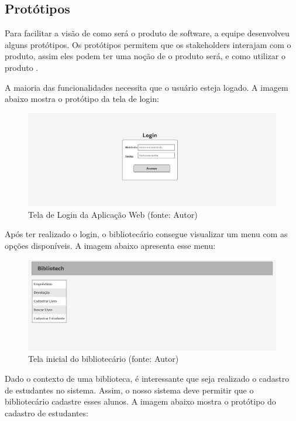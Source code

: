 \subsection[Protótipos]{Protótipos}
Para facilitar a visão de como será o produto de software, a equipe desenvolveu alguns protótipos. Os protótipos permitem que os stakeholders interajam com o produto, assim eles podem ter uma noção de o produto será, e como utilizar o produto \cite{preece2005}. 

A maioria das funcionalidades necessita que o usuário esteja logado. A imagem abaixo mostra o protótipo da tela de login: 

\begin{figure}[!h]
\centering
\includegraphics[scale=0.40, angle = 360]{figuras/prototipo1}
\caption[]{Tela de Login da Aplicação Web (fonte: Autor)}
\end{figure}
\FloatBarrier

Após ter realizado o login, o bibliotecário consegue visualizar um menu com as opções disponíveis. A imagem abaixo apresenta esse menu:

\begin{figure}[!h]
\centering
\includegraphics[scale=0.40, angle = 360]{figuras/prototipo2}
\caption[]{Tela inicial do bibliotecário (fonte: Autor)}
\end{figure}
\FloatBarrier

Dado o contexto de uma biblioteca, é interessante que seja realizado o cadastro de estudantes no sistema. Assim, o nosso sistema deve permitir que o bibliotecário cadastre esses alunos. A imagem abaixo mostra o protótipo do cadastro de estudantes:

